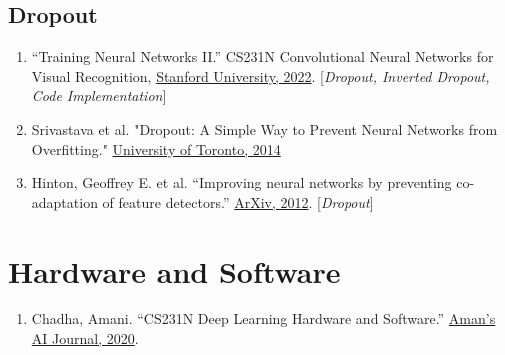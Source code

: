 \documentclass[12pt]{article}
\begin{document}
\subsection{Dropout}
\begin{enumerate}
    \item “Training Neural Networks II.” 
    CS231N Convolutional Neural Networks for Visual Recognition, 
    \href{https://cs231n.github.io/neural-networks-2/#reg}{Stanford University, 2022}. 
    [\emph{Dropout, Inverted Dropout, Code Implementation}]

    \item Srivastava et al. "Dropout: A Simple Way to Prevent Neural Networks 
    from Overfitting." 
    \href{http://www.cs.toronto.edu/~rsalakhu/papers/srivastava14a.pdf}
    {University of Toronto, 2014}

    \item Hinton, Geoffrey E. et al. “Improving neural networks 
    by preventing co-adaptation of feature detectors.” 
    \href{https://arxiv.org/abs/1207.0580}{ArXiv, 2012}. [\emph{Dropout}] 
\end{enumerate}

\section{Hardware and Software}
\begin{enumerate}
    \item Chadha, Amani. “CS231N Deep Learning Hardware and Software.” 
    \href{https://aman.ai/cs231n/deeplearning-HW-SW/}
    {Aman's AI Journal, 2020}.
\end{enumerate}
\end{document}
